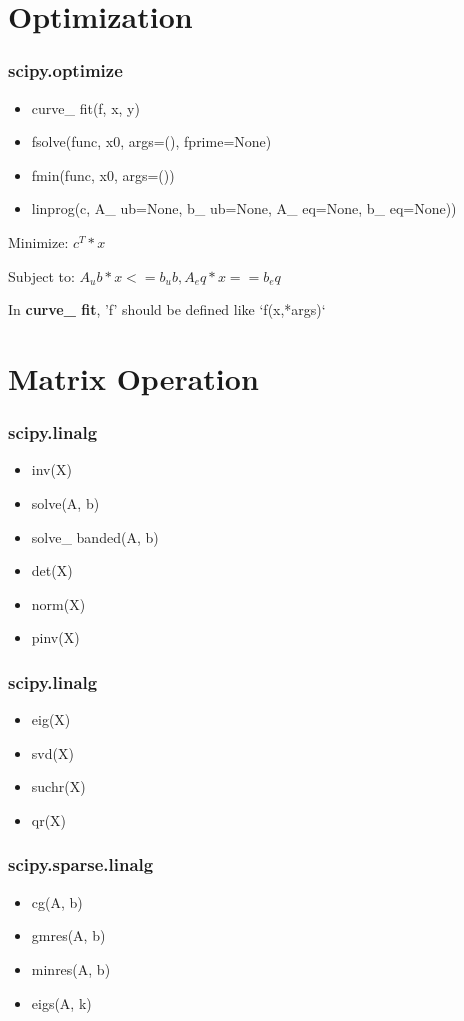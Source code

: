\documentclass[english, nochinese]{beamer}
\begin{document}
\section{Optimization}
\begin{frame}
\frametitle{scipy.optimize}
\begin{itemize}
\item curve\_ fit(f, x, y)
\item  fsolve(func, x0, args=(), fprime=None)
\item  fmin(func, x0, args=())
\item linprog({c, A\_ ub=None, b\_ ub=None, A\_ eq=None, b\_ eq=None)})
\end{itemize}
Minimize:     $c^T * x$

Subject to:  $ A_ub * x <= b_ub, A_eq * x == b_eq$

In \textbf{curve\_ fit}, 'f' should be defined like `f(x,*args)`

\end{frame}

\section{Matrix Operation}
\begin{frame}
\frametitle{scipy.linalg}
\begin{itemize}
\item inv(X)
\item solve(A, b)
\item solve\_ banded(A, b)
\item det(X)
\item norm(X)
\item pinv(X)
\end{itemize}
\end{frame}

\begin{frame}
\frametitle{scipy.linalg}
\begin{itemize}
\item eig(X)
\item svd(X)
\item suchr(X)
\item qr(X)
\end{itemize}
\end{frame}

\begin{frame}
\frametitle{scipy.sparse.linalg}
\begin{itemize}
\item cg(A, b)
\item gmres(A, b)
\item minres(A, b)
\item eigs(A, k)
\end{itemize}
\end{frame}
\end{document}
